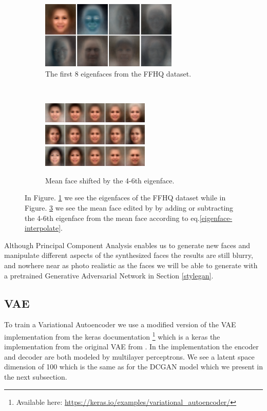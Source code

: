 \begin{figure} [h!]
\centering
    \begin{subfigure}[b]{0.55\textwidth}
    \includegraphics[height=3.2cm]{fig/PCA/pca}
     \caption{The first 8 eigenfaces from the FFHQ dataset.}
    \label{eigenfacehere}
    \end{subfigure}
    ~
    \begin{subfigure}[b]{0.4\textwidth}
        \includegraphics[height=1cm]{fig/PCA/pca3}
        \includegraphics[height=1cm]{fig/PCA/pca4}
         \includegraphics[height=1cm]{fig/PCA/pca5}
         \caption{Mean face shifted by the 4-6th eigenface.}
         \label{components}
    \end{subfigure}
     \caption{ In Figure. \ref{eigenfacehere} we see the eigenfaces of the FFHQ dataset while in Figure. \ref{components} we see the mean face edited by by adding or subtracting the 4-6th eigenface from the mean face according to eq.\ref{eigenface-interpolate}.}
\end{figure}
Although Principal Component Analysis enables us to generate new faces and manipulate different aspects of the synthesized faces the results are still blurry, and nowhere near as photo realistic as the faces we will be able to generate with a pretrained Generative Adversarial Network in Section \ref{stylegan}.

\subsection{VAE}
To train a Variational Autoencoder we use a modified version of the VAE implementation from the keras documentation \footnote{ Available here: \url{https://keras.io/examples/variational_autoencoder/}} which is a keras the implementation from the original VAE from \cite{vae1}. In the implementation the encoder and decoder are both modeled by multilayer perceptrons. We see a latent space dimension of 100 which is the same as for the DCGAN model which we present in the next subsection.

